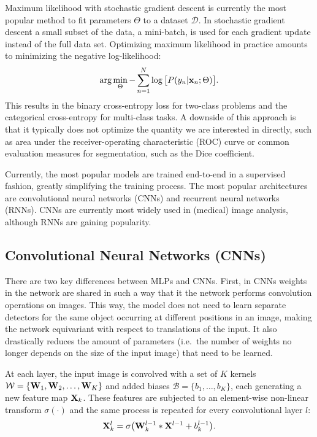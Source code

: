 Maximum likelihood with stochastic gradient descent is currently the most popular method to fit parameters $\Theta$ to a dataset $\mathcal{D}$. In stochastic gradient descent a small subset of the data, a mini-batch, is used for each gradient update instead of the full data set. Optimizing maximum likelihood in practice amounts to minimizing the negative log-likelihood:
\begin{equation}
\arg \min_{\Theta} - \sum^{N}_{n = 1} \log\big[ P(y_{n}| {\bf x}_{n}; \Theta) \big].
\end{equation}
This results in the binary cross-entropy loss for two-class problems and the categorical cross-entropy for multi-class tasks. A downside of this approach is that it typically does not optimize the quantity we are interested in directly, such as area under the receiver-operating characteristic (ROC) curve or common evaluation measures for segmentation, such as the Dice coefficient. 

Currently, the most popular models are trained end-to-end in a supervised fashion, greatly simplifying the training process. The most popular architectures are convolutional neural networks (CNNs) and recurrent neural networks (RNNs). CNNs are currently most widely used in (medical) image analysis, although RNNs are gaining popularity. 

\subsection{Convolutional Neural Networks (CNNs)}
There are two key differences between MLPs and CNNs. First, in CNNs weights in the network are shared in such a way that it the network performs convolution operations on images. This way, the model does not need to learn separate detectors for the same object occurring at different positions in an image, making the network equivariant with respect to translations of the input. It also drastically reduces the amount of parameters (i.e.\ the number of weights no longer depends on the size of the input image) that need to be learned. 

At each layer, the input image is convolved with a set of $K$ kernels  $\mathcal{W} = \{ {\bf W}_{1}, {\bf W}_{2}, \ldots, {\bf W}_{K} \} $ and added biases $\mathcal{B} = \{b_{1}, \ldots, b_{K}\}$, each generating a new feature map ${\bf X}_{k}$. These features are subjected to an element-wise non-linear transform $\sigma(\cdot)$ and the same process is repeated for every convolutional layer $l$:
\begin{equation}
\label{eq::mapping_cnn}
{\bf X}_{k}^{l} = \sigma\big( {\bf W}_{k}^{l -1} \ast {\bf X}^{l -1} + b_{k}^{l-1} \big).
\end{equation}


